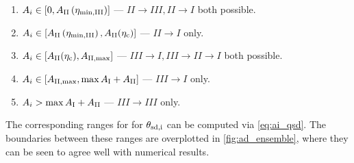 \documentclass[
        fleqn,
        usenatbib,
        referee,
    ]{mnras}
\newcommand*{\p}[1]{\left(#1\right)}
\newcommand*{\s}[1]{\left[#1\right]}
\begin{document}
\begin{enumerate}
    \item $A_i \in \s{0, A_{\rm II}\p{\eta_{\rm \min, III}}}$ --- $II \to III,
        II \to I$ both possible.

    \item $A_i \in \s{A_{\rm II}\p{\eta_{\rm \min, III}}, A_{\rm II}(\eta_{\rm c})}$
        --- $II \to I$ only.

    \item $A_i \in \s{A_{\rm II}(\eta_{\rm c}), A_{\rm II, \max}}$ --- $III \to I, III
        \to II \to I$ both possible.

    \item $A_i \in \s{A_{\rm II, \max}, \max A_{\rm I} + A_{\rm II}}$ --- $III
        \to I$ only.

    \item $A_i > \max A_{\rm I} + A_{\rm II}$ --- $III \to III$ only.
\end{enumerate}
The corresponding ranges for for $\theta_{\rm sd,i}$ can be computed via
\autoref{eq:ai_qsd}. The boundaries between these ranges are overplotted in
\autoref{fig:ad_ensemble}, where they can be seen to agree well with numerical
results.
\end{document}
